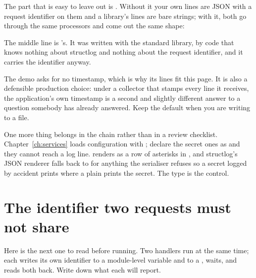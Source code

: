 

\noindent
The part that is easy to leave out is . Without
it your own lines are JSON with a request identifier on them and a
library's lines are bare strings; with it, both go through the same
processors and come out the same shape:


\noindent
The middle line is 's. It was written with the standard
library, by code that knows nothing about structlog and nothing about the
request identifier, and it carries the identifier anyway.

\begin{note}
The demo asks for no timestamp, which is why its lines fit this page. It
is also a defensible production choice: under a collector that stamps
every line it receives, the application's own timestamp is a second and
slightly different answer to a question somebody has already answered.
Keep the default when you are writing to a file.
\end{note}

\noindent
One more thing belongs in the chain rather than in a review checklist.
Chapter~\ref{ch:services} loads configuration with ;
declare the secret ones as  and they cannot reach a log
line.  renders as a row of asterisks in , and
structlog's JSON renderer falls back to  for anything the
serialiser refuses \dash{} so a secret logged by accident prints
 where a plain  prints the secret.
The type is the control.

\section{The identifier two requests must not share}
\label{sec:ch12-contextvars}

Here is the next one to read before running. Two handlers run at the same
time; each writes its own identifier to a module-level variable and to a
, waits, and reads both back. Write down what each will
report.

